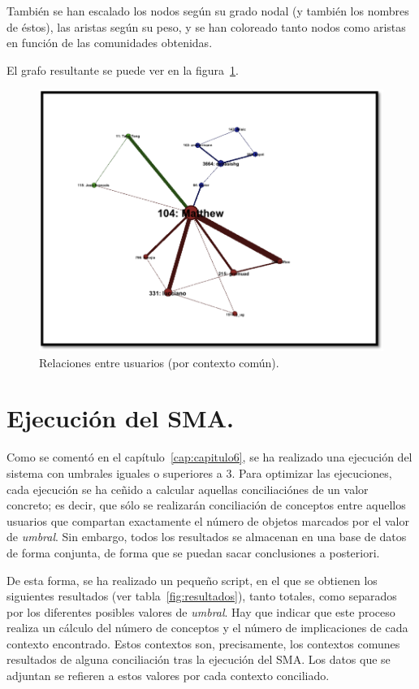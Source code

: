 También se han escalado los nodos según su grado nodal (y también los nombres de éstos), las aristas según su peso, y se han coloreado tanto nodos como aristas en función de las comunidades obtenidas.

El grafo resultante se puede ver en la figura~\ref{fig:grafo42}.

\begin{figure}
\centering
\includegraphics[scale=0.7]{img/7/grafo42}
\caption{Relaciones entre usuarios (por contexto común).
\label{fig:grafo42}}
\end{figure}


\section{Ejecución del SMA.}

Como se comentó en el capítulo~\ref{cap:capitulo6}, se ha realizado una ejecución del sistema con umbrales iguales o superiores a 3. Para optimizar las ejecuciones, cada ejecución se ha ceñido a calcular aquellas conciliaciónes de un valor concreto; es decir, que sólo se realizarán conciliación de conceptos entre aquellos usuarios que compartan exactamente el número de objetos marcados por el valor de \emph{umbral}. Sin embargo, todos los resultados se almacenan en una base de datos de forma conjunta, de forma que se puedan sacar conclusiones a posteriori.

De esta forma, se ha realizado un pequeño script, en el que se obtienen los siguientes resultados (ver tabla~\ref{fig:resultados}), tanto totales, como separados por los diferentes posibles valores de \emph{umbral}. Hay que indicar que este proceso realiza un cálculo del número de conceptos y el número de implicaciones de cada contexto encontrado. Estos contextos son, precisamente, los contextos comunes resultados de alguna conciliación tras la ejecución del SMA. Los datos que se adjuntan se refieren a estos valores por cada contexto conciliado.

